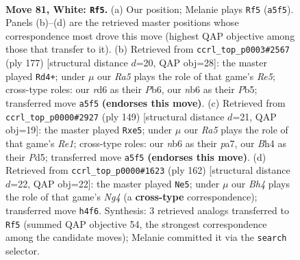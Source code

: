 \documentclass[11pt]{article}
\begin{document}
\clearpage

\begin{figure}[p]\centering
\begin{subfigure}{0.46\textwidth}\centering
\resizebox{\linewidth}{!}{%
\newchessgame
\chessboard[
  setfen={7k/8/1n1r4/R7/p4P1B/P6P/7K/8 w - - 17 81},
  showmover=false,
  pgfstyle=straightmove, color=movearrow, markmove={a5-f5}
]}
\caption{}
\end{subfigure}\hfill
\begin{subfigure}{0.46\textwidth}\centering
\resizebox{\linewidth}{!}{%
\newchessgame
\chessboard[
  setfen={8/8/1p1k4/1p6/1N2r2p/P6R/3K4/8 b - - 39 89},
  showmover=false,
  pgfstyle=straightmove, color=movearrow, markmove={e4-d4}
]}
\caption{}
\end{subfigure}
\\[4pt]
\begin{subfigure}{0.46\textwidth}\centering
\resizebox{\linewidth}{!}{%
\newchessgame
\chessboard[
  setfen={4r3/PK6/6p1/3pB1k1/8/7p/4N3/8 b - - 1 75},
  showmover=false,
  pgfstyle=straightmove, color=movearrow, markmove={e8-e5}
]}
\caption{}
\end{subfigure}\hfill
\begin{subfigure}{0.46\textwidth}\centering
\resizebox{\linewidth}{!}{%
\newchessgame
\chessboard[
  setfen={5k2/8/2R3p1/2p5/4nPN1/4P3/r7/6K1 w - - 3 82},
  showmover=false,
  pgfstyle=straightmove, color=movearrow, markmove={g4-e5}
]}
\caption{}
\end{subfigure}
\caption{\textbf{Move 81, White: \texttt{Rf5}.} (a) Our position; Melanie plays \texttt{Rf5} (\texttt{a5f5}). Panels (b)--(d) are the retrieved master positions whose correspondence most drove this move (highest QAP objective among those that transfer to it). (b) Retrieved from \texttt{ccrl\_top\_p0003\#2567} (ply 177) [structural distance $d$=20, QAP obj=28]: the master played \texttt{Rd4+}; under $\mu$ our \emph{Ra5} plays the role of that game's \emph{Re5}; cross-type roles: our \emph{r}d6 as their \emph{P}b6, our \emph{n}b6 as their \emph{P}b5; transferred move \texttt{a5f5} \textbf{(endorses this move)}. (c) Retrieved from \texttt{ccrl\_top\_p0000\#2927} (ply 149) [structural distance $d$=21, QAP obj=19]: the master played \texttt{Rxe5}; under $\mu$ our \emph{Ra5} plays the role of that game's \emph{Re1}; cross-type roles: our \emph{n}b6 as their \emph{p}a7, our \emph{B}h4 as their \emph{P}d5; transferred move \texttt{a5f5} \textbf{(endorses this move)}. (d) Retrieved from \texttt{ccrl\_top\_p0000\#1623} (ply 162) [structural distance $d$=22, QAP obj=22]: the master played \texttt{Ne5}; under $\mu$ our \emph{Bh4} plays the role of that game's \emph{Ng4} (a \textbf{cross-type} correspondence); transferred move \texttt{h4f6}. Synthesis: 3 retrieved analogs transferred to \texttt{Rf5} (summed QAP objective 54, the strongest correspondence among the candidate moves); Melanie committed it via the \texttt{search} selector.}
\label{fig:thought-m160}
\end{figure}
\end{document}
